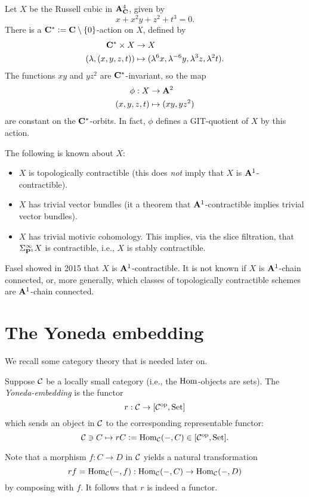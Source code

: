 \begin{example}
Let $X$ be the Russell cubic in $\mathbf{A}^4_{\mathbf{C}}$, given by 
\[
x+x^2y+z^2+t^3=0.
\]There is a $\mathbf{C}^*\vcentcolon=\mathbf{C}\setminus\{0\}$-action on $X$, defined by
\begin{align*}
\mathbf{C}^*\times X&\to X\\
(\lambda,(x,y,z,t))&\mapsto(\lambda^6x, \lambda^{-6}y,\lambda^3z,\lambda^2t).
\end{align*}
The functions $xy$ and $yz^2$ are $\mathbf{C}^*$-invariant, so the map
\begin{align*}
\phi:X&\to\mathbf{A}^2\\
(x,y,z,t)&\mapsto (xy,yz^2)
\end{align*}are constant on the $\mathbf{C}^*$-orbits. In fact, $\phi$ defines a GIT-quotient of $X$ by this action.

The following is known about $X$:
\begin{itemize}
\item $X$ is topologically contractible (this does \emph{not} imply that $X$ is $\mathbf{A}^1$-contractible).
\item $X$ has trivial vector bundles (it a theorem that $\mathbf{A}^1$-contractible implies trivial vector bundles).
\item $X$ has trivial motivic cohomology. This implies, via the slice filtration, that $\Sigma_{\mathbf{P}^1}^\infty X$ is contractible, i.e., $X$ is stably contractible.
\end{itemize}
Fasel showed in 2015 that $X$ is $\mathbf{A}^1$-contractible. It is not known if $X$ is $\mathbf{A}^1$-chain connected, or, more generally, which classes of topologically contractible schemes are $\mathbf{A}^1$-chain connected.
\end{example}

\section{The Yoneda embedding}
We recall some category theory that is needed later on.

\begin{definition}
Suppose $\mathcal{C}$ be a locally small category (i.e., the $\operatorname{Hom}$-objects are sets). The \emph{Yoneda-embedding} is the functor 
\[
r:\mathcal{C} \to[\mathcal{C}^{\mathrm{op}},\mathrm{Set}]\]
which sends an object in $\mathcal{C}$ to the corresponding representable functor:
\[\mathcal{C}\ni C\mapsto rC\vcentcolon=\operatorname{Hom}_{\mathcal{C}}(-,C)\in[\mathcal{C}^{\mathrm{op}},\mathrm{Set}].
\]
\end{definition}
Note that a morphism $f:C\to D$ in $\mathcal{C}$ yields a natural transformation
\[rf=\operatorname{Hom}_{\mathcal{C}}(-,f):\operatorname{Hom}_{\mathcal{C}}(-,C)\to\operatorname{Hom}_{\mathcal{C}}(-,D)
\]by composing with $f$. It follows that $r$ is indeed a functor.

